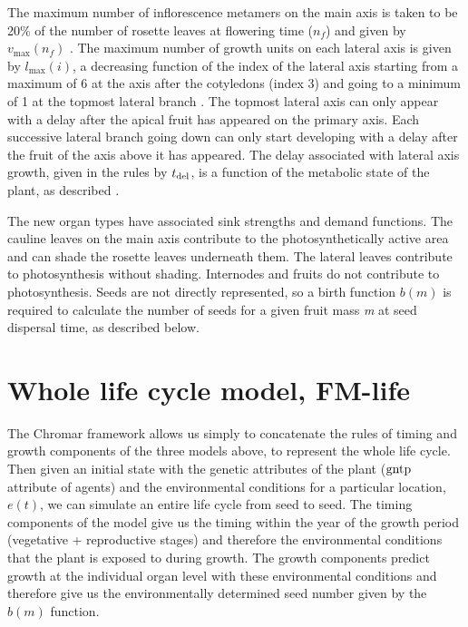 The maximum number of inflorescence metamers on the main axis is taken to be
20\% of the number of rosette leaves at flowering time (\(n_{f}\)) and given by
\(v_{\max}(n_{f})\) \citep{pouteau_significance_2009}. The maximum number of
growth units on each lateral axis is given by \(l_{\max}(i)\), a decreasing
function of the index of the lateral axis starting from a maximum of 6 at the
axis after the cotyledons (index 3) and going to a minimum of 1 at the topmost
lateral branch \citep{mundermann_quantitative_2005}. The topmost lateral axis
can only appear with a delay after the apical fruit has appeared on the primary
axis. Each successive lateral branch going down can only start developing with a
delay after the fruit of the axis above it has appeared. The delay associated
with lateral axis growth, given in the rules by \(t_{\mathrm{del}}\), is a function
of the metabolic state of the plant, as described
\citep{christophe_model-based_2008}.


The new organ types have associated sink strengths and demand functions.  The
cauline leaves on the main axis contribute to the photosynthetically active area
and can shade the rosette leaves underneath them. The lateral leaves contribute
to photosynthesis without shading. Internodes and fruits do not contribute to
photosynthesis. Seeds are not directly represented, so a birth function \(b(m)\)
is required to calculate the number of seeds for a given fruit mass \emph{m} at
seed dispersal time, as described below.

\section{Whole life cycle model, FM-life}
\label{whole-life-cycle-model-fm-life}
The Chromar framework allows us simply to concatenate the rules of
timing and growth components of the three models above, to represent the
whole life cycle. Then given an initial state with the genetic
attributes of the plant (\(\mathrm{gntp}\) attribute of agents) and the
environmental conditions for a particular location, \(e(t)\), we can
simulate an entire life cycle from seed to seed. The timing components
of the model give us the timing within the year of the growth period
(vegetative + reproductive stages) and therefore the environmental
conditions that the plant is exposed to during growth. The growth
components predict growth at the individual organ level with these
environmental conditions and therefore give us the environmentally
determined seed number given by the \(b(m)\) function.

